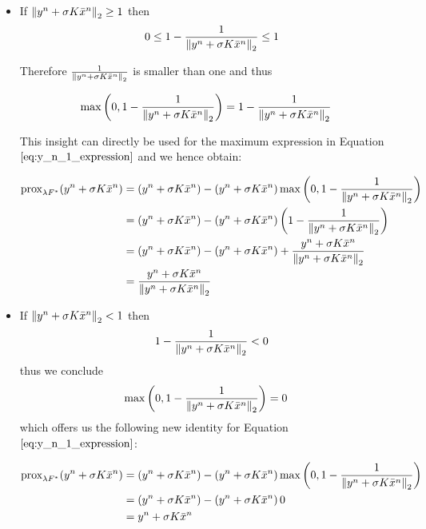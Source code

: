 \begin{itemize}
	\item If $\left\lVert y^n + \sigma K \bar{x}^{n}\right\rVert_2 \geq 1$
		then  
		\begin{align}
			0 \leq 1-\frac{1}{\left\lVert y^n + \sigma K \bar{x}^{n}\right\rVert_2} \leq 1
		\end{align}
		
		Therefore $\frac{1}{\left\lVert y^n + \sigma K \bar{x}^{n}\right\rVert_2}$ is smaller than one and thus
		
		\begin{align}
			\max{\left(0, 1-\frac{1}{\left\lVert y^n + \sigma K \bar{x}^{n}\right\rVert_2}\right)} 
			&= 1-\frac{1}{\left\lVert y^n + \sigma K \bar{x}^{n}\right\rVert_2}
		\end{align}
		
		This insight can directly be used for the maximum expression in Equation $\ref{eq:y_n_1_expression}$ and we hence obtain:
		
		\begin{align}
			\text{prox}_{\lambda F^*}(y^n + \sigma K \bar{x}^{n})
			&= (y^n + \sigma K \bar{x}^{n}) - \left( y^n + \sigma K \bar{x}^{n} \right) \max{\left(0, 1-\frac{1}{\left\lVert y^n + \sigma K \bar{x}^{n} \right\rVert_2}\right)} \nonumber \\
			&= (y^n + \sigma K \bar{x}^{n}) - \left( y^n + \sigma K \bar{x}^{n} \right) \left( 1-\frac{1}{\left\lVert y^n + \sigma K \bar{x}^{n}\right\rVert_2} \right)\nonumber \\
			&= (y^n + \sigma K \bar{x}^{n}) -(y^n + \sigma K \bar{x}^{n}) +\frac{y^n + \sigma K \bar{x}^{n}}{\left\lVert y^n + \sigma K \bar{x}^{n}\right\rVert_2} \nonumber \\
			&= \frac{y^n + \sigma K \bar{x}^{n}}{\left\lVert y^n + \sigma K \bar{x}^{n}\right\rVert_2}
		\end{align}
		
	\item If $\left\lVert y^n + \sigma K \bar{x}^{n}\right\rVert_2 < 1$
		then 
		\begin{align}
			1-\frac{1}{\left\lVert y^n + \sigma K \bar{x}^{n}\right\rVert_2} < 0
		\end{align}
		thus we conclude 
		\begin{align}
			\max{\left(0, 1-\frac{1}{\left\lVert y^n + \sigma K \bar{x}^{n}\right\rVert_2}\right)} 
			&= 0
		\end{align}
		which offers us the following new identity for Equation $\ref{eq:y_n_1_expression}$:
		
		\begin{align}
			\text{prox}_{\lambda F^*}(y^n + \sigma K \bar{x}^{n})
			&= (y^n + \sigma K \bar{x}^{n}) - \left( y^n + \sigma K \bar{x}^{n} \right) \max{\left(0, 1-\frac{1}{\left\lVert y^n + \sigma K \bar{x}^{n} \right\rVert_2}\right)} \nonumber \\
			&= (y^n + \sigma K \bar{x}^{n}) - \left( y^n + \sigma K \bar{x}^{n} \right) 0 \nonumber \\
			&= y^n + \sigma K \bar{x}^{n}
		\end{align}
\end{itemize}
